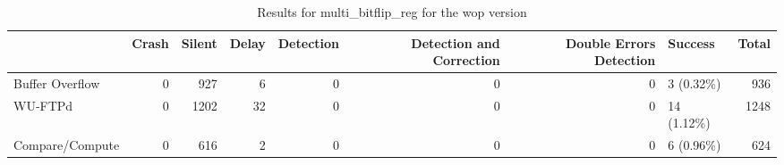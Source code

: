 \begin{table}[t]
	\centering
	\caption{Results for multi_bitflip_reg for the wop version}
	\label{table:end_sim_by_status_wop_1_multi_bitflip_reg}
	\begin{tabular}{lrrrrrrlr}
		\toprule
		                & Crash & Silent & Delay & Detection & Detection and Correction & Double Errors Detection & Success     & Total \\
		\midrule
		Buffer Overflow & 0     & 927    & 6     & 0         & 0                        & 0                       & 3 (0.32\%)  & 936   \\
		WU-FTPd         & 0     & 1202   & 32    & 0         & 0                        & 0                       & 14 (1.12\%) & 1248  \\
		Compare/Compute & 0     & 616    & 2     & 0         & 0                        & 0                       & 6 (0.96\%)  & 624   \\
		\bottomrule
	\end{tabular}
\end{table}
